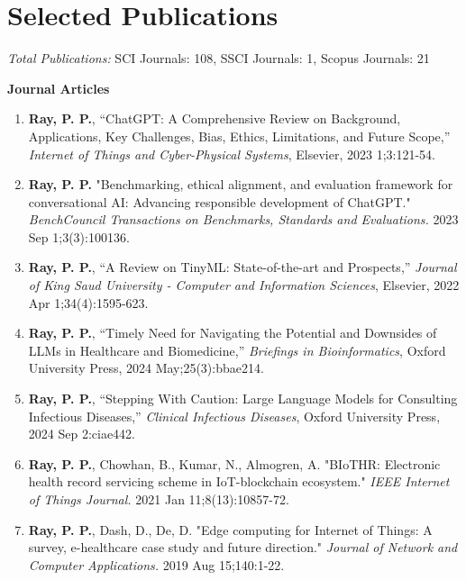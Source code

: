 \documentclass[10pt,a4paper]{article}
\begin{document}
	\section*{Selected Publications}
	
	\textit{Total Publications:} SCI Journals: 108, SSCI Journals: 1, Scopus Journals: 21
	
	\textbf{Journal Articles}
	\begin{enumerate}[leftmargin=0.2in]
		\item \textbf{Ray, P. P.}, “ChatGPT: A Comprehensive Review on Background, Applications, Key Challenges, Bias, Ethics, Limitations, and Future Scope,” \textit{Internet of Things and Cyber-Physical Systems}, Elsevier, 2023 1;3:121-54.
		\item \textbf{Ray, P. P.} "Benchmarking, ethical alignment, and evaluation framework for conversational AI: Advancing responsible development of ChatGPT." \textit{BenchCouncil Transactions on Benchmarks, Standards and Evaluations.} 2023 Sep 1;3(3):100136.
		\item \textbf{Ray, P. P.}, “A Review on TinyML: State-of-the-art and Prospects,” \textit{Journal of King Saud University - Computer and Information Sciences}, Elsevier, 2022 Apr 1;34(4):1595-623.
				
		\item \textbf{Ray, P. P.}, “Timely Need for Navigating the Potential and Downsides of LLMs in Healthcare and Biomedicine,” \textit{Briefings in Bioinformatics}, Oxford University Press, 2024 May;25(3):bbae214.
		\item \textbf{Ray, P. P.}, “Stepping With Caution: Large Language Models for Consulting Infectious Diseases,” \textit{Clinical Infectious Diseases}, Oxford University Press, 2024 Sep 2:ciae442.

		\item \textbf{Ray, P. P.}, Chowhan, B., Kumar, N., Almogren, A. "BIoTHR: Electronic health record servicing scheme in IoT-blockchain ecosystem." \textit{IEEE Internet of Things Journal.} 2021 Jan 11;8(13):10857-72.
		
		\item \textbf{Ray, P. P.}, Dash, D., De, D. "Edge computing for Internet of Things: A survey, e-healthcare case study and future direction." \textit{Journal of Network and Computer Applications.} 2019 Aug 15;140:1-22.
	\end{enumerate}
	
\end{document}
